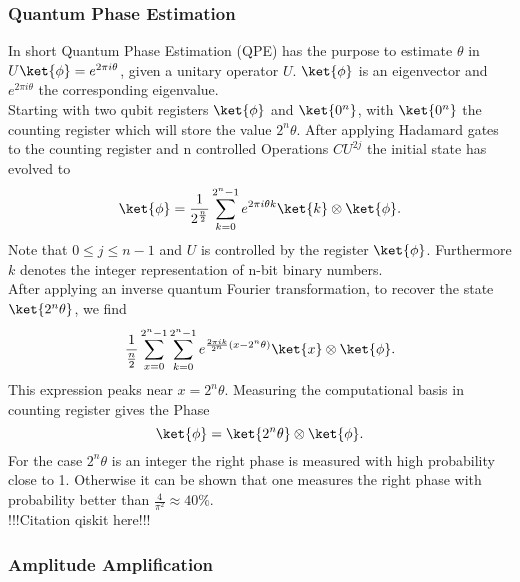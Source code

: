 \documentclass[../../main.tex]{subfiles}
\begin{document}
\subsubsection{Quantum Phase Estimation}\label{sec:QPE}
In short Quantum Phase Estimation (QPE) has the purpose to estimate $\theta$ in $U\ket{\phi} = e^{2 \pi i \theta }$, given a unitary operator $U$.
$\ket{\phi}$ is an eigenvector and $e^{2 \pi i \theta }$ the corresponding eigenvalue.\\
Starting with two qubit registers $\ket{\phi}$ and $\ket{0^n}$, with $\ket{0^n}$ the counting register
which will store the value $2^n \theta$. After applying Hadamard gates to the counting register and n controlled Operations $CU^{2j}$ the initial state has evolved to
\begin{equation}
  \ket{\phi} = \frac{1}{2^{\frac{n}{2}}} \sum_{k=0}^{2^n-1} e^{2 \pi i \theta k} \ket{k} \otimes \ket{\phi}.
\end{equation}
Note that $0 \le j \le n-1$ and $U$ is controlled by the register $\ket{\phi}$. Furthermore $k$ denotes the integer representation of n-bit binary numbers.\\
After applying  an inverse quantum Fourier transformation, to recover the state $\ket{2^n \theta}$, we find
\begin{equation}
  \frac{1}{\frac{n}{2}} \sum_{x=0}^{2^n-1} \sum_{k=0}^{2^n-1} e^{\frac{2 \pi i k}{2^n}(x - 2^n \theta)} \ket{x} \otimes \ket{\phi}.
\end{equation}
This expression peaks near $x=2^n \theta$. Measuring the computational basis in counting register gives the Phase
\begin{equation}
  \ket{\phi} = \ket{2^n \theta} \otimes \ket{\phi}.
\end{equation}
For the case $2^n \theta$ is an integer the right phase is measured with high probability close to 1. Otherwise it can be shown that one measures the right phase
with probability better than $\frac{4}{\pi^2} \approx 40 \% $.\\
!!!Citation qiskit here!!!
\subsubsection{Amplitude Amplification}\label{sec:amplitudeAmplification}
\end{document}
